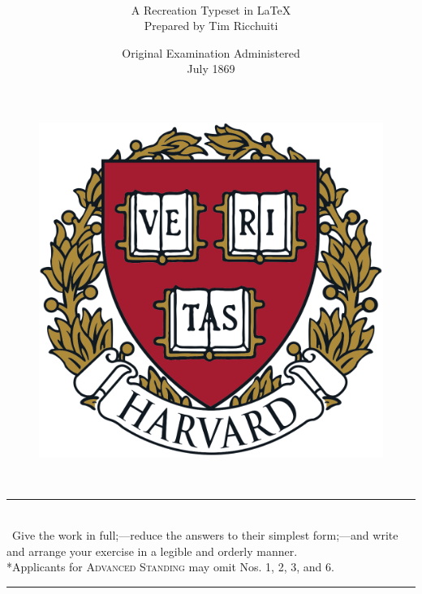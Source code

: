 \documentclass[11pt]{article}
\title{\textls[200]{\LARGE{\textbf{\uppercase{Mathematical Portions}}}} \\
       \textls[150]{\Large{\textbf{\uppercase{of the}}}} \\
       \textls[180]{\LARGE{\textbf{\uppercase{1869 Harvard}}}} \\
       \textls[180]{\LARGE{\textbf{\uppercase{Entrance Examination}}}}}
\author{A Recreation Typeset in \LaTeX \\ Prepared by Tim Ricchuiti}
\date{Original Examination Administered \\ July 1869}
\begin{document}
\begin{figure}
    \centering
    \includegraphics[width=0.25\linewidth]{images/harvardcrest.png}
\end{figure}
\maketitle
\thispagestyle{empty}
\newpage


\begin{center}
     \\ \vspace{12pt}
    \rule{3cm}{0.4pt} \\ \vspace{12pt}
    \small{\HandRight\ Give the work in full;---reduce the answers to their simplest form;---and write and arrange your exercise in a legible and orderly manner.} \\
    *Applicants for \textsc{Advanced Standing} may omit Nos. 1, 2, 3, and 6.\\
    \rule{3cm}{0.4pt} \\ \vspace{12pt}
\end{center}
\end{document}
